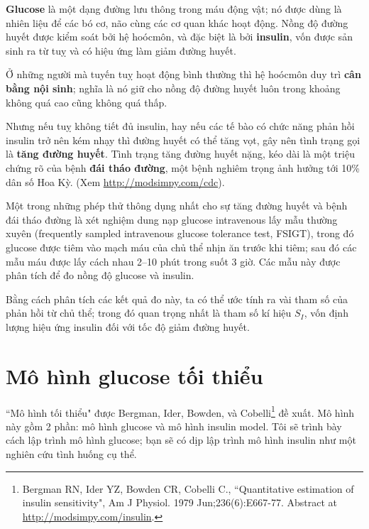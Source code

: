 \documentclass[12pt]{book}
\theoremstyle{exercise}
\begin{document}
{\bf Glucose} là một dạng đường lưu thông trong máu động vật; nó được dùng là nhiên liệu để các bó cơ, não cùng các cơ quan khác hoạt động. Nồng độ đường huyết được kiểm soát bởi hệ hoócmôn, và đặc biệt là bởi {\bf insulin}, vốn được sản sinh ra từ tuỵ và có hiệu ứng làm giảm đường huyết.


Ở những người mà tuyến tuỵ hoạt động bình thường thì hệ hoócmôn duy trì {\bf cân bằng nội sinh}; nghĩa là nó giữ cho nồng độ đường huyết luôn trong khoảng không quá cao cũng không quá thấp.

Nhưng nếu tuỵ không tiết đủ insulin, hay nếu các tế bào có chức năng phản hồi insulin trở nên kém nhạy thì đường huyết có thể tăng vọt, gây nên tình trạng gọi là {\bf tăng đường huyết}.  Tình trạng tăng đường huyết nặng, kéo dài là một triệu chứng rõ của bệnh {\bf đái tháo đường}, một bệnh nghiêm trọng ảnh hưởng tới 10\% dân số Hoa Kỳ. (Xem \url{http://modsimpy.com/cdc}).


Một trong những phép thử thông dụng nhất cho sự tăng đường huyết và bệnh đái tháo đường là xét nghiệm dung nạp glucose intravenous lấy mẫu thường xuyên (frequently sampled intravenous glucose tolerance test, FSIGT), trong đó glucose được tiêm vào mạch máu của chủ thể nhịn ăn trước khi tiêm; sau đó các mẫu máu được lấy cách nhau 2--10 phút trong suốt 3 giờ. Các mẫu này được phân tích để đo nồng độ glucose và insulin.


Bằng cách phân tích các kết quả đo này, ta có thể ước tính ra vài tham số của phản hồi từ chủ thể; trong đó quan trọng nhất là tham số kí hiệu $S_I$, vốn định lượng hiệu ứng insulin đối với tốc độ giảm đường huyết.


\section{Mô hình glucose tối thiểu}

``Mô hình tối thiểu" được Bergman, Ider, Bowden, và Cobelli\footnote{Bergman RN, Ider YZ, Bowden CR, Cobelli C., ``Quantitative estimation of insulin sensitivity", Am J Physiol. 1979 Jun;236(6):E667-77.  Abstract at \url{http://modsimpy.com/insulin}.} đề xuất.
Mô hình này gồm 2 phần: mô hình glucose và mô hình insulin model.  Tôi sẽ trình bày cách lập trình mô hình glucose; bạn sẽ có dịp lập trình mô hình insulin như một nghiên cứu tình huống cụ thể.
\end{document}
